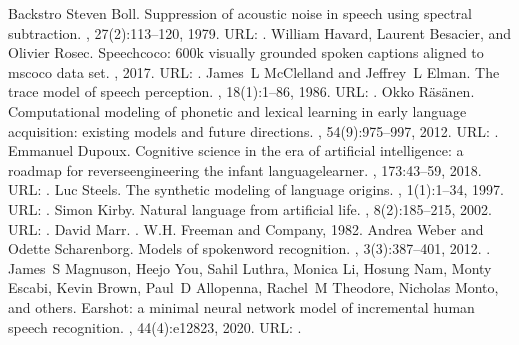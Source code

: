 \documentclass[letterpaper,10pt,english]{jupyterBook}
\begin{document}
\begin{sphinxthebibliography}{Backstro}
\sphinxAtStartPar
Steven Boll. Suppression of acoustic noise in speech using spectral subtraction. , 27(2):113–120, 1979. URL: .
\sphinxAtStartPar
William Havard, Laurent Besacier, and Olivier Rosec. Speech\sphinxhyphen{}coco: 600k visually grounded spoken captions aligned to mscoco data set. , 2017. URL: .
\sphinxAtStartPar
James L McClelland and Jeffrey L Elman. The trace model of speech perception. , 18(1):1–86, 1986. URL: .
\sphinxAtStartPar
Okko Räsänen. Computational modeling of phonetic and lexical learning in early language acquisition: existing models and future directions. , 54(9):975–997, 2012. URL: .
\sphinxAtStartPar
Emmanuel Dupoux. Cognitive science in the era of artificial intelligence: a roadmap for reverse\sphinxhyphen{}engineering the infant language\sphinxhyphen{}learner. , 173:43–59, 2018. URL: .
\sphinxAtStartPar
Luc Steels. The synthetic modeling of language origins. , 1(1):1–34, 1997. URL: .
\sphinxAtStartPar
Simon Kirby. Natural language from artificial life. , 8(2):185–215, 2002. URL: .
\sphinxAtStartPar
David Marr. . W.H. Freeman and Company, 1982.
\sphinxAtStartPar
Andrea Weber and Odette Scharenborg. Models of spoken\sphinxhyphen{}word recognition. , 3(3):387–401, 2012. .
\sphinxAtStartPar
James S Magnuson, Heejo You, Sahil Luthra, Monica Li, Hosung Nam, Monty Escabi, Kevin Brown, Paul D Allopenna, Rachel M Theodore, Nicholas Monto, and others. Earshot: a minimal neural network model of incremental human speech recognition. , 44(4):e12823, 2020. URL: .

\end{sphinxthebibliography}
\end{document}
